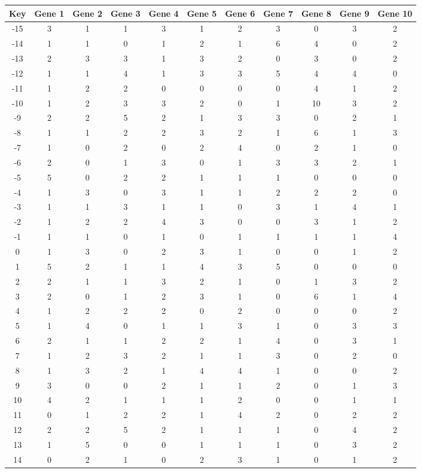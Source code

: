\begin{tabular}{|c|c|c|c|c|c|c|c|c|c|c|}
\hline
Key & Gene 1 & Gene 2 & Gene 3 & Gene 4 & Gene 5 & Gene 6 & Gene 7 & Gene 8 & Gene 9 & Gene 10 \\
\hline
-15 & 3 & 1 & 1 & 3 & 1 & 2 & 3 & 0 & 3 & 2 \\
-14 & 1 & 1 & 0 & 1 & 2 & 1 & 6 & 4 & 0 & 2 \\
-13 & 2 & 3 & 3 & 1 & 3 & 2 & 0 & 3 & 0 & 2 \\
-12 & 1 & 1 & 4 & 1 & 3 & 3 & 5 & 4 & 4 & 0 \\
-11 & 1 & 2 & 2 & 0 & 0 & 0 & 0 & 4 & 1 & 2 \\
-10 & 1 & 2 & 3 & 3 & 2 & 0 & 1 & 10 & 3 & 2 \\
-9 & 2 & 2 & 5 & 2 & 1 & 3 & 3 & 0 & 2 & 1 \\
-8 & 1 & 1 & 2 & 2 & 3 & 2 & 1 & 6 & 1 & 3 \\
-7 & 1 & 0 & 2 & 0 & 2 & 4 & 0 & 2 & 1 & 0 \\
-6 & 2 & 0 & 1 & 3 & 0 & 1 & 3 & 3 & 2 & 1 \\
-5 & 5 & 0 & 2 & 2 & 1 & 1 & 1 & 0 & 0 & 0 \\
-4 & 1 & 3 & 0 & 3 & 1 & 1 & 2 & 2 & 2 & 0 \\
-3 & 1 & 1 & 3 & 1 & 1 & 0 & 3 & 1 & 4 & 1 \\
-2 & 1 & 2 & 2 & 4 & 3 & 0 & 0 & 3 & 1 & 2 \\
-1 & 1 & 1 & 0 & 1 & 0 & 1 & 1 & 1 & 1 & 4 \\
0 & 1 & 3 & 0 & 2 & 3 & 1 & 0 & 0 & 1 & 2 \\
1 & 5 & 2 & 1 & 1 & 4 & 3 & 5 & 0 & 0 & 0 \\
2 & 2 & 1 & 1 & 3 & 2 & 1 & 0 & 1 & 3 & 2 \\
3 & 2 & 0 & 1 & 2 & 3 & 1 & 0 & 6 & 1 & 4 \\
4 & 1 & 2 & 2 & 2 & 0 & 2 & 0 & 0 & 0 & 2 \\
5 & 1 & 4 & 0 & 1 & 1 & 3 & 1 & 0 & 3 & 3 \\
6 & 2 & 1 & 1 & 2 & 2 & 1 & 4 & 0 & 3 & 1 \\
7 & 1 & 2 & 3 & 2 & 1 & 1 & 3 & 0 & 2 & 0 \\
8 & 1 & 3 & 2 & 1 & 4 & 4 & 1 & 0 & 0 & 2 \\
9 & 3 & 0 & 0 & 2 & 1 & 1 & 2 & 0 & 1 & 3 \\
10 & 4 & 2 & 1 & 1 & 1 & 2 & 0 & 0 & 1 & 1 \\
11 & 0 & 1 & 2 & 2 & 1 & 4 & 2 & 0 & 2 & 2 \\
12 & 2 & 2 & 5 & 2 & 1 & 1 & 1 & 0 & 4 & 2 \\
13 & 1 & 5 & 0 & 0 & 1 & 1 & 1 & 0 & 3 & 2 \\
14 & 0 & 2 & 1 & 0 & 2 & 3 & 1 & 0 & 1 & 2 \\
\hline
\end{tabular}